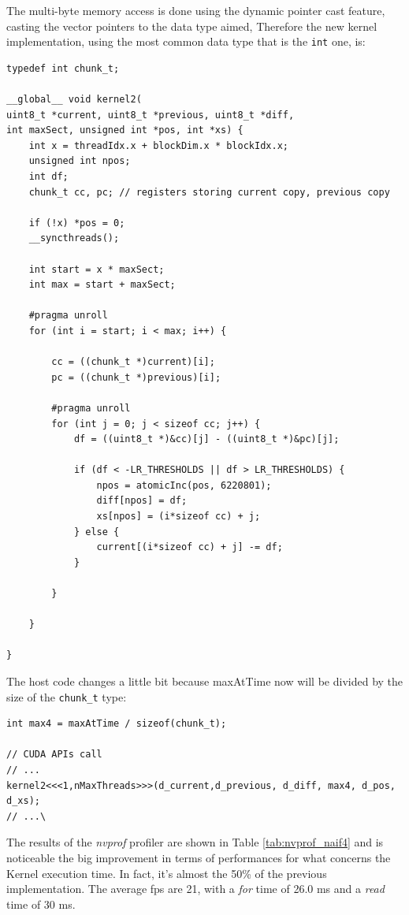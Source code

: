 \documentclass[paper=a4, fontsize=10pt]{scrartcl}	%
\begin{document}
	The multi-byte memory access is done using the dynamic pointer cast feature, casting the vector pointers to the data type aimed, Therefore the new kernel implementation, using the most common data type that is the \texttt{int} one, is:

	\begin{lstlisting}[style=CStyle]
typedef int chunk_t;

__global__ void kernel2(
uint8_t *current, uint8_t *previous, uint8_t *diff, 
int maxSect, unsigned int *pos, int *xs) {
    int x = threadIdx.x + blockDim.x * blockIdx.x;
    unsigned int npos;
    int df;
    chunk_t cc, pc; // registers storing current copy, previous copy

    if (!x) *pos = 0;
    __syncthreads();

    int start = x * maxSect;
    int max = start + maxSect;

    #pragma unroll
    for (int i = start; i < max; i++) {

        cc = ((chunk_t *)current)[i];
        pc = ((chunk_t *)previous)[i];

        #pragma unroll
        for (int j = 0; j < sizeof cc; j++) {
            df = ((uint8_t *)&cc)[j] - ((uint8_t *)&pc)[j];

            if (df < -LR_THRESHOLDS || df > LR_THRESHOLDS) {
                npos = atomicInc(pos, 6220801);
                diff[npos] = df;
                xs[npos] = (i*sizeof cc) + j;
            } else {
                current[(i*sizeof cc) + j] -= df;
            }

        }

    }

}
	\end{lstlisting}

	The host code changes a little bit because maxAtTime now will be divided by the size of the \texttt{chunk\_t} type:

	\begin{lstlisting}[style=CStyle]
int max4 = maxAtTime / sizeof(chunk_t);

// CUDA APIs call
// ...
kernel2<<<1,nMaxThreads>>>(d_current,d_previous, d_diff, max4, d_pos, d_xs);
// ...\
\end{lstlisting}

	The results of the \textit{nvprof} profiler are shown in Table \ref{tab:nvprof_naif4} and is noticeable the big improvement in terms of performances for what concerns the Kernel execution time. In fact, it's almost the 50\% of the previous implementation. The average fps are 21, with a \textit{for} time of 26.0 ms and a \textit{read} time of 30 ms.
\end{document}
